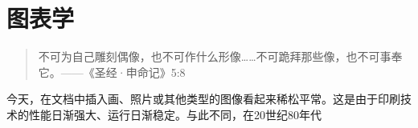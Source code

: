 \chapter{图表学}

\begin{quote}
    不可为自己雕刻偶像，也不可作什么形像……不可跪拜那些像，也不可事奉它。——《圣经·申命记》5:8
\end{quote}

今天，在文档中插入画、照片或其他类型的图像看起来稀松平常。这是由于印刷技术的性能日渐强大、运行日渐稳定。与此不同，在20世纪80年代